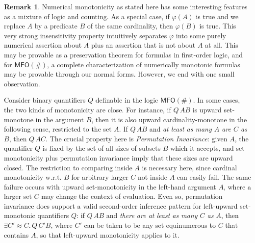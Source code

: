 \documentclass[12pt,oneside,reqno]{amsart}
\theoremstyle{definition}
\newtheorem{remark}{Remark}
\begin{document}
\begin{remark} \label{remark:mon} Numerical monotonicity as stated here has some interesting features as a mixture of logic and counting. As a special case, if $\varphi(A)$ is true and we replace $A$ by a predicate $B$ of the same cardinality, then $\varphi(B)$ is true. This very strong insensitivity property intuitively separates $\varphi$ into some purely numerical assertion about $A$ plus an assertion that is not about $A$ at all. This may be provable as a preservation theorem for formulas in first-order logic, and for  $\mathsf{MFO(\#)}$, a complete characterization of numerically monotonic formulas may be provable through our normal forms. However, we end with one small observation. 

Consider binary quantifiers $Q$ definable in the logic $\mathsf{MFO(\#)}$. In some cases, the two kinds of monotonicity are close. For instance, if $Q\, AB$ is upward set-monotone in the argument $B$, then it is also upward cardinality-monotone in the following sense, restricted to the set $A$. If $Q\, AB$ and \emph{at least as many $A$ are $C$ as $B$}, then $Q\,AC$. The crucial property here is  \emph{Permutation Invariance}: given $A$, the quantifier $Q$ is fixed by the set of all sizes of subsets $B$ which it accepts, and set-monotonicity plus permutation invariance imply that these sizes are upward closed. The restriction to comparing inside $A$ is necessary here, since cardinal monotonicity w.r.t. $B$ for arbitrary larger $C$  not inside $A$ can easily fail.  The same failure occurs with upward set-monotonicity in the left-hand argument $A$, where a larger set $C$ may change the context of evaluation. Even so, permutation invariance does support a valid second-order inference pattern for left-upward set-monotonic quantifiers $Q$:  if $Q\, AB$ and 
  \emph{there are at least as many $C$ as $A$}, then $\exists C' \approx C.\, Q\, C'B$, where $C'$ can be taken to be any set equinumerous to $C$ that contains $A$, so that left-upward monotonicity applies to it. 


 
\end{remark}

\end{document}
